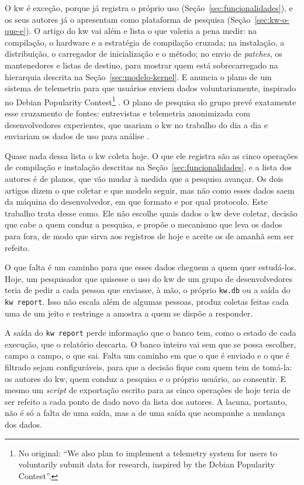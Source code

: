 O kw é exceção, porque já registra o próprio uso (Seção~\ref{sec:funcionalidades}),
e os seus autores já o apresentam como plataforma de pesquisa
(Seção~\ref{sec:kw-o-que-e}). O artigo do kw vai além e lista o que valeria a
pena medir: na compilação, o hardware e a estratégia de compilação cruzada;
na instalação, a distribuição, o carregador de inicialização e o método; no
envio de \textit{patches}, os mantenedores e listas de destino, para mostrar
quem está sobrecarregado na hierarquia descrita na
Seção~\ref{sec:modelo-kernel}. E anuncia o plano de um sistema de telemetria
para que usuários enviem dados voluntariamente, inspirado no Debian Popularity
Contest\footnote{No original: \enquote{We also plan to implement a telemetry
system for users to voluntarily submit data for research, inspired by the
Debian Popularity Contest}.} \citep{tadokoro2025kw, debianpopcon}. O plano de
pesquisa do grupo prevê exatamente esse cruzamento de fontes: entrevistas e
telemetria anonimizada com desenvolvedores experientes, que usariam o kw no
trabalho do dia a dia e enviariam os dados de uso para análise
\citep{tadokoro2025sustain}.

Quase nada dessa lista o kw coleta hoje. O que ele registra são as cinco
operações de compilação e instalação descritas na
Seção~\ref{sec:funcionalidades}, e a lista dos autores é de planos, que vão
mudar à medida que a pesquisa avançar. Os dois artigos dizem o que coletar e
que modelo seguir, mas não como esses dados saem da máquina do
desenvolvedor, em que formato e por qual protocolo. Este trabalho trata
desse como. Ele não escolhe quais dados o kw deve coletar, decisão que cabe a
quem conduz a pesquisa, e propõe o mecanismo que leva os dados para fora, de
modo que sirva aos registros de hoje e aceite os de amanhã sem ser refeito.

O que falta é um caminho para que esses dados
cheguem a quem quer estudá-los. Hoje, um pesquisador que quisesse o uso do kw
de um grupo de desenvolvedores teria de pedir a cada pessoa que enviasse, à
mão, o próprio \texttt{kw.db} ou a saída do \texttt{kw report}. Isso não
escala além de algumas pessoas, produz coletas feitas cada uma de um jeito e
restringe a amostra a quem se dispõe a responder.

A saída do \texttt{kw report} perde informação que o banco tem, como o estado
de cada execução, que o relatório descarta. O banco inteiro vai sem que se
possa escolher, campo a campo, o que sai. Falta um caminho em que o que é
enviado e o que é filtrado sejam configuráveis, para que a decisão fique com
quem tem de tomá-la: os autores do kw, quem conduz a pesquisa e o próprio
usuário, ao consentir. E mesmo um \textit{script} de exportação escrito para
as cinco operações de hoje teria de ser refeito a cada ponto de dado novo da
lista dos autores. A lacuna, portanto, não é só a falta de uma saída, mas a de
uma saída que acompanhe a mudança dos dados.

